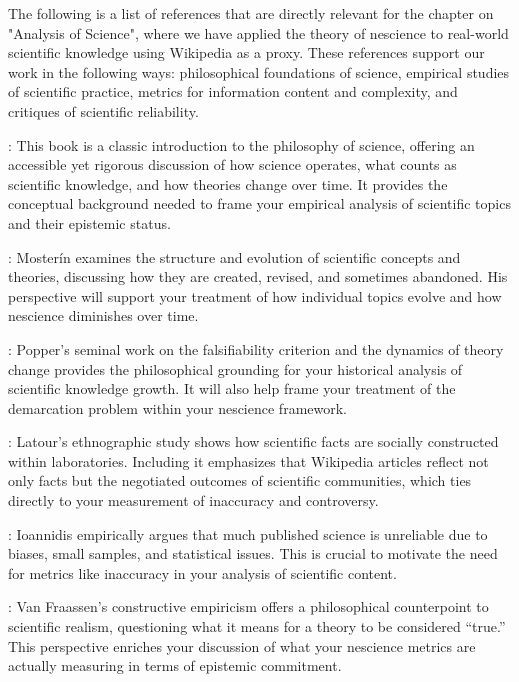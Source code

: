 The following is a list of references that are directly relevant for the chapter on "Analysis of Science", where we have applied the theory of nescience to real-world scientific knowledge using Wikipedia as a proxy. These references support our work in the following ways: philosophical foundations of science, empirical studies of scientific practice, metrics for information content and complexity, and critiques of scientific reliability.

\cite{chalmers2013thing}: This book is a classic introduction to the philosophy of science, offering an accessible yet rigorous discussion of how science operates, what counts as scientific knowledge, and how theories change over time. It provides the conceptual background needed to frame your empirical analysis of scientific topics and their epistemic status.

\cite{mosterin2016conceptos}: Mosterín examines the structure and evolution of scientific concepts and theories, discussing how they are created, revised, and sometimes abandoned. His perspective will support your treatment of how individual topics evolve and how nescience diminishes over time.

\cite{popper2014conjectures}: Popper's seminal work on the falsifiability criterion and the dynamics of theory change provides the philosophical grounding for your historical analysis of scientific knowledge growth. It will also help frame your treatment of the demarcation problem within your nescience framework.

\cite{latour2013laboratory}: Latour's ethnographic study shows how scientific facts are socially constructed within laboratories. Including it emphasizes that Wikipedia articles reflect not only facts but the negotiated outcomes of scientific communities, which ties directly to your measurement of inaccuracy and controversy.

\cite{ioannidis2005most}: Ioannidis empirically argues that much published science is unreliable due to biases, small samples, and statistical issues. This is crucial to motivate the need for metrics like inaccuracy in your analysis of scientific content.

\cite{van1980scientific}: Van Fraassen's constructive empiricism offers a philosophical counterpoint to scientific realism, questioning what it means for a theory to be considered “true.” This perspective enriches your discussion of what your nescience metrics are actually measuring in terms of epistemic commitment.

